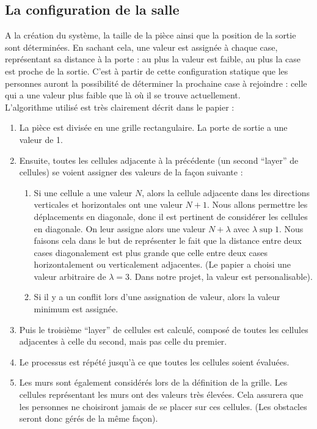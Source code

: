 \documentclass[twoside,UTF8]{EPURapport}
\begin{document}
	\subsection{La configuration de la salle}
	A la création du système, la taille de la pièce ainsi que la position de la sortie sont déterminées. En sachant cela, une valeur est assignée à chaque case, représentant sa distance à la porte : au plus la valeur est faible, au plus la case est proche de la sortie. C'est à partir de cette configuration statique que les personnes auront la possibilité de déterminer la prochaine case à rejoindre : celle qui a une valeur plus faible que là où il se trouve actuellement. \\
	L'algorithme utilisé est très clairement décrit dans le papier :
	\begin{enumerate}
	\item La pièce est divisée en une grille rectangulaire. La porte de sortie a une valeur de 1.
	\item Ensuite, toutes les cellules adjacente à la précédente (un second ``layer'' de cellules) se voient assigner des valeurs de la façon suivante :
		\begin{enumerate}
			\item Si une cellule a une valeur $N$, alors la cellule adjacente dans les directions verticales et horizontales ont une valeur $N + 1$. Nous allons permettre les déplacements en diagonale, donc il est pertinent de considérer les cellules en diagonale. On leur assigne alors une valeur $N + \lambda$ avec $\lambda \sup 1$. Nous faisons cela dans le but de représenter le fait que la distance entre deux cases diagonalement est plus grande que celle entre deux cases horizontalement ou verticalement adjacentes. (Le papier a choisi une valeur arbitraire de $\lambda = 3$. Dans notre projet, la valeur est personalisable).
			\item Si il y a un conflit lors d'une assignation de valeur, alors la valeur minimum est assignée.
		\end{enumerate}

		\item Puis le troisième ``layer'' de cellules est calculé, composé de toutes les cellules adjacentes à celle du second, mais pas celle du premier.
		\item Le processus est répété jusqu'à ce que toutes les cellules soient évaluées.
		\item Les murs sont également considérés lors de la définition de la grille. Les cellules représentant les murs ont des valeurs très élevées. Cela assurera que les personnes ne choisiront jamais de se placer sur ces cellules. (Les obstacles seront donc gérés de la même façon).
	\end{enumerate}
\end{document}
